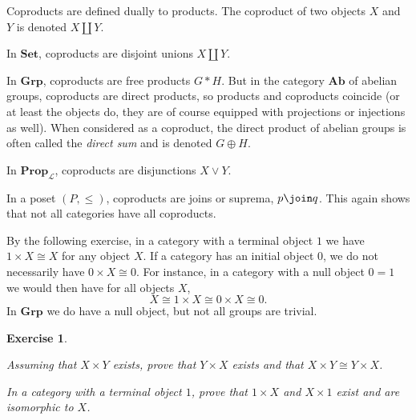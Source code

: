 \documentclass[article, a4paper, 11pt, oneside]{memoir}
\numberwithin{equation}{chapter}
\newcommand{\calL}{\mathcal{L}}
\newcommand{\ncat}[1]{\mathbf{#1}} %
\newcommand{\catSet}{\ncat{Set}}
\newcommand{\catGrp}{\ncat{Grp}}
\newcommand{\catAb}{\ncat{Ab}}
\newcommand{\catProp}{\ncat{Prop}}
\renewcommand{\coprod}{\amalg}
\newcommand{\freeprod}{*} %
\newcommand{\dirsum}{\oplus}
\theoremstyle{myexample}
\theoremstyle{myexamplebreak}
\newtheorem{exercisebreak}[theorem]{Exercise}
\begin{document}
\begin{example}
    Coproducts are defined dually to products. The coproduct of two objects $X$ and $Y$ is denoted $X \coprod Y$.
    \begin{enumexample}
        \item In $\catSet$, coproducts are disjoint unions $X \coprod Y$.
        
        \item In $\catGrp$, coproducts are free products $G \freeprod H$. But in the category $\catAb$ of abelian groups, coproducts are direct products, so products and coproducts coincide (or at least the objects do, they are of course equipped with projections or injections as well). When considered as a coproduct, the direct product of abelian groups is often called the \emph{direct sum} and is denoted $G \dirsum H$.
        
        \item In $\catProp_\calL$, coproducts are disjunctions $X \lor Y$.
        
        \item In a poset $(P, \leq)$, coproducts are joins or suprema, $p \join q$. This again shows that not all categories have all coproducts.
    \end{enumexample}
\end{example}


\begin{remark}
    By the following exercise, in a category with a terminal object $1$ we have $1 \times X \cong X$ for any object $X$. If a category has an initial object $0$, we do not necessarily have $0 \times X \cong 0$. For instance, in a category with a null object $0 = 1$ we would then have for all objects $X$,
    \begin{equation*}
        X
            \cong 1 \times X
            \cong 0 \times X
            \cong 0.
    \end{equation*}
    In $\catGrp$ we do have a null object, but not all groups are trivial.
\end{remark}


\begin{exercisebreak}
    \begin{enumexercise}        
        \item Assuming that $X \times Y$ exists, prove that $Y \times X$ exists and that $X \times Y \cong Y \times X$.

        \item \label{exer:1timesXisoX} In a category with a terminal object $1$, prove that $1 \times X$ and $X \times 1$ exist and are isomorphic to $X$.
    \end{enumexercise}
\end{exercisebreak}
\end{document}
